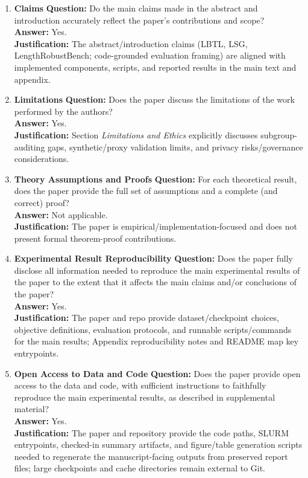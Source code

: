 \begin{enumerate}

\item \textbf{Claims}
\textbf{Question:} Do the main claims made in the abstract and introduction accurately reflect the paper's contributions and scope?\\
\textbf{Answer:} Yes.\\
\textbf{Justification:} The abstract/introduction claims (LBTL, LSG, LengthRobustBench; code-grounded evaluation framing) are aligned with implemented components, scripts, and reported results in the main text and appendix.

\item \textbf{Limitations}
\textbf{Question:} Does the paper discuss the limitations of the work performed by the authors?\\
\textbf{Answer:} Yes.\\
\textbf{Justification:} Section \emph{Limitations and Ethics} explicitly discusses subgroup-auditing gaps, synthetic/proxy validation limits, and privacy risks/governance considerations.

\item \textbf{Theory Assumptions and Proofs}
\textbf{Question:} For each theoretical result, does the paper provide the full set of assumptions and a complete (and correct) proof?\\
\textbf{Answer:} Not applicable.\\
\textbf{Justification:} The paper is empirical/implementation-focused and does not present formal theorem-proof contributions.

\item \textbf{Experimental Result Reproducibility}
\textbf{Question:} Does the paper fully disclose all information needed to reproduce the main experimental results of the paper to the extent that it affects the main claims and/or conclusions of the paper?\\
\textbf{Answer:} Yes.\\
\textbf{Justification:} The paper and repo provide dataset/checkpoint choices, objective definitions, evaluation protocols, and runnable scripts/commands for the main results; Appendix reproducibility notes and README map key entrypoints.

\item \textbf{Open Access to Data and Code}
\textbf{Question:} Does the paper provide open access to the data and code, with sufficient instructions to faithfully reproduce the main experimental results, as described in supplemental material?\\
\textbf{Answer:} Yes.\\
\textbf{Justification:} The paper and repository provide the code paths, SLURM entrypoints, checked-in summary artifacts, and figure/table generation scripts needed to regenerate the manuscript-facing outputs from preserved report files; large checkpoints and cache directories remain external to Git.


\end{enumerate}
